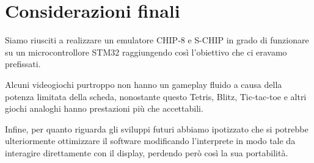 \documentclass[a4paper]{article}
\begin{document}
\section{Considerazioni finali}

Siamo riusciti a realizzare un emulatore CHIP-8 e S-CHIP in grado di funzionare su un
microcontrollore STM32 raggiungendo così l'obiettivo che ci eravamo prefissati.

Alcuni videogiochi purtroppo non hanno un gameplay fluido a causa della potenza
limitata della scheda, nonostante questo Tetris, Blitz, Tic-tac-toe e altri giochi
analoghi hanno prestazioni più che accettabili.

Infine, per quanto riguarda gli sviluppi futuri abbiamo ipotizzato che si potrebbe ulteriormente
ottimizzare il software modificando l'interprete in modo tale da interagire direttamente con
il display, perdendo però così la sua portabilità.

%



\end{document}
